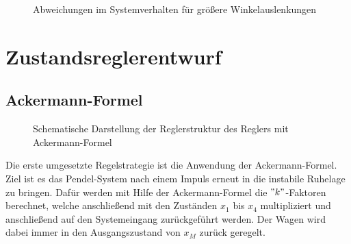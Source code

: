 \documentclass[
	pagesize,
	fontsize=12pt,
	paper=a4,
	oneside,
   reqno
]{scrartcl}
\begin{document}
\begin{figure}[H]
    \centering
    \caption[Vergleich der beiden Winkelverläufe in Grad mit Abweichung]{Abweichungen im Systemverhalten für größere Winkelauslenkungen}
    \label{fig:Bild6}
\end{figure}

\clearpage

\section{Zustandsreglerentwurf}

\subsection{Ackermann-Formel} \label{sec:Ackermann}

\begin{figure}[H]
    \centering
    \caption[Reglerstruktur Ackermann]{Schematische Darstellung der Reglerstruktur des Reglers mit Ackermann-Formel}
    \label{fig:Bild7}
\end{figure}

Die erste umgesetzte Regelstrategie ist die Anwendung der Ackermann-Formel. Ziel ist es das Pendel-System nach einem Impuls erneut in die instabile Ruhelage zu bringen. Dafür werden mit Hilfe der Ackermann-Formel die $"k"$-Faktoren berechnet, welche anschließend mit den Zuständen $x_{\mathrm{1}}$ bis $x_{\mathrm{4}}$ multipliziert und anschließend auf den Systemeingang zurückgeführt werden. Der Wagen wird dabei immer in den Ausgangszustand von $x_M$ zurück geregelt.\\
\end{document}
